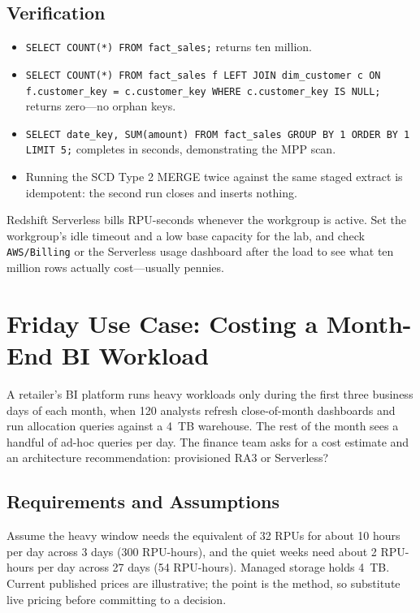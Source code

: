 \subsection*{Verification}
\begin{itemize}
    \item \texttt{SELECT COUNT(*) FROM fact\_sales;} returns ten million.
    \item \texttt{SELECT COUNT(*) FROM fact\_sales f LEFT JOIN dim\_customer c ON f.customer\_key = c.customer\_key WHERE c.customer\_key IS NULL;} returns zero---no orphan keys.
    \item \texttt{SELECT date\_key, SUM(amount) FROM fact\_sales GROUP BY 1 ORDER BY 1 LIMIT 5;} completes in seconds, demonstrating the MPP scan.
    \item Running the SCD Type 2 MERGE twice against the same staged extract is idempotent: the second run closes and inserts nothing.
\end{itemize}

\begin{tipbox}
Redshift Serverless bills RPU-seconds whenever the workgroup is active. Set the workgroup's idle timeout and a low base capacity for the lab, and check \texttt{AWS/Billing} or the Serverless usage dashboard after the load to see what ten million rows actually cost---usually pennies.
\end{tipbox}

\section{Friday Use Case: Costing a Month-End BI Workload}
A retailer's BI platform runs heavy workloads only during the first three business days of each month, when 120 analysts refresh close-of-month dashboards and run allocation queries against a 4~TB warehouse. The rest of the month sees a handful of ad-hoc queries per day. The finance team asks for a cost estimate and an architecture recommendation: provisioned RA3 or Serverless?

\subsection{Requirements and Assumptions}
Assume the heavy window needs the equivalent of 32 RPUs for about 10 hours per day across 3 days (300 RPU-hours), and the quiet weeks need about 2 RPU-hours per day across 27 days (54 RPU-hours). Managed storage holds 4~TB. Current published prices are illustrative; the point is the method, so substitute live pricing before committing to a decision.

